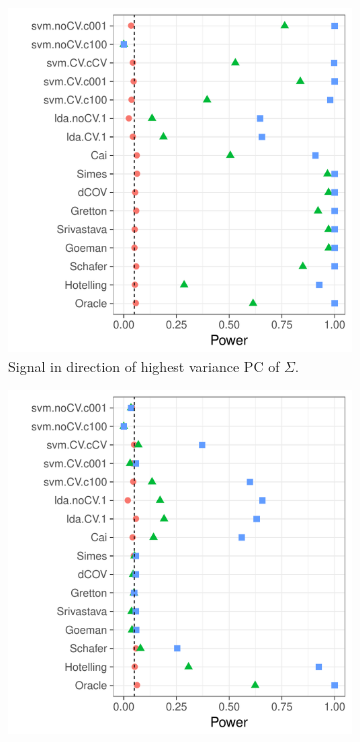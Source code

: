 \documentclass[onecolumn,draftclsnofoot]{IEEEtran}
\begin{document}
\begin{figure}[h]
	\centering
	\caption{Long-memory Brownian motion correlation: $\Sigma=D^{-1} R D^{-1}$ where $D$ is diagonal with $D_{jj}=\sqrt{R_{jj}}$, and $R_{k,l}=\min\{k,l\}$.}	
	\label{fig:dependence_2}
	\begin{subfigure}[t]{.45\columnwidth}
		\centering
		\includegraphics[width=1\columnwidth]{"art/file22"}
		\caption{Signal in direction of highest variance PC of $\Sigma$.} 
		\label{fig:dependence_21}
	\end{subfigure}
	\begin{subfigure}[t]{.45\columnwidth}
		\centering
		\includegraphics[width=1\columnwidth]{"art/file23"}

\end{subfigure}
\end{figure}
\end{document}
